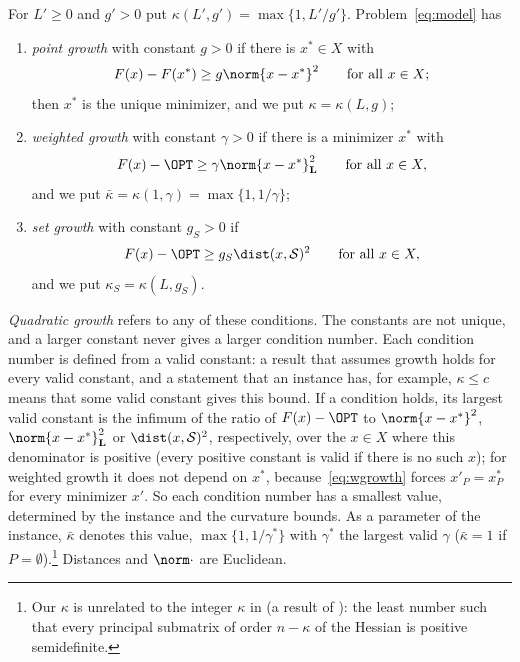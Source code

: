 \begin{definition}\label{def:growth}
For $L'\ge0$ and $g'>0$ put $\kappa(L',g')=\max\{1,L'/g'\}$.
Problem~\eqref{eq:model} has
\begin{enumerate}[label=(\alph*)]
\item \emph{point growth} with constant $g>0$ if there is $x^*\in X$ with
\begin{equation}\label{eq:growth}
F(x)-F(x^*)\ge g\norm{x-x^*}^2\qquad\text{for all }x\in X ;
\end{equation}
then $x^*$ is the unique minimizer, and we put $\kappa=\kappa(L,g)$;
\item \emph{weighted growth} with constant $\gamma>0$ if there is a minimizer
$x^*$ with
\begin{equation}\label{eq:wgrowth}
F(x)-\OPT\ge\gamma\norm{x-x^*}_{\mathbf L}^2\qquad\text{for all }x\in X ,
\end{equation}
and we put $\bar\kappa=\kappa(1,\gamma)=\max\{1,1/\gamma\}$;
\item \emph{set growth} with constant $g_S>0$ if
\begin{equation}\label{eq:setgrowth}
F(x)-\OPT\ge g_S\dist(x,\mathcal S)^2\qquad\text{for all }x\in X ,
\end{equation}
and we put $\kappa_S=\kappa(L,g_S)$.
\end{enumerate}
\end{definition}

\emph{Quadratic growth} refers to any of these conditions. The constants are
not unique, and a larger constant never gives a larger condition number. Each
condition number is defined from a valid constant: a result that assumes
growth holds for every valid constant, and a statement that an instance has,
for example, $\kappa\le c$ means that some valid constant gives this bound.
If a condition holds, its largest valid constant is the infimum of the ratio
of $F(x)-\OPT$ to $\norm{x-x^*}^2$, $\norm{x-x^*}_{\mathbf L}^2$ or
$\dist(x,\mathcal S)^2$, respectively, over the $x\in X$ where this
denominator is positive (every positive constant is valid if there is no
such $x$); for weighted growth it
does not depend on $x^*$, because~\eqref{eq:wgrowth} forces $x'_P=x^*_P$
for every minimizer $x'$. So each condition number has a smallest value,
determined by the instance and the curvature bounds. As a parameter of the
instance, $\bar\kappa$ denotes this value, $\max\{1,1/\gamma^*\}$ with
$\gamma^*$ the largest valid $\gamma$ ($\bar\kappa=1$ if
$P=\emptyset$).\footnote{Our $\kappa$ is unrelated to the integer $\kappa$ in
\cite[Lemma~20]{DelPiaKhajavirad2026} (a result of
\cite{Khajavirad2026PolyBox}): the least number such that every principal
submatrix of order $n-\kappa$ of the Hessian is positive semidefinite.}
Distances and $\norm\cdot$ are Euclidean.

